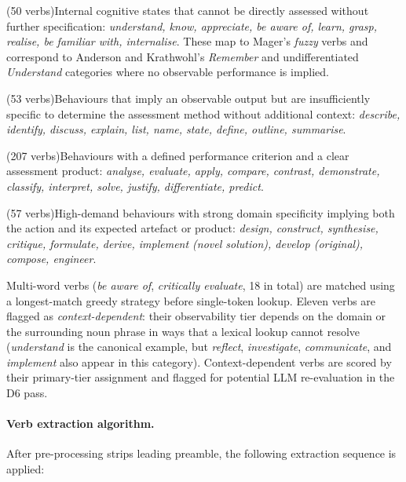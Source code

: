\documentclass[12pt, a4paper]{article}
\begin{document}
\begin{description}[leftmargin=3em, labelwidth=2.5em]
  \item[Tier 0 — Unobservable] (50 verbs)\quad Internal cognitive states that cannot be directly
    assessed without further specification: \textit{understand, know, appreciate,
    be aware of, learn, grasp, realise, be familiar with, internalise}.
    These map to Mager's \textit{fuzzy} verbs and correspond to Anderson and
    Krathwohl's \textit{Remember} and undifferentiated \textit{Understand} categories
    where no observable performance is implied.
  \item[Tier 1 — Weak observable] (53 verbs)\quad Behaviours that imply an observable
    output but are insufficiently specific to determine the assessment method without
    additional context: \textit{describe, identify, discuss, explain, list, name,
    state, define, outline, summarise}.
  \item[Tier 2 — Clear observable] (207 verbs)\quad Behaviours with a defined
    performance criterion and a clear assessment product: \textit{analyse, evaluate,
    apply, compare, contrast, demonstrate, classify, interpret, solve, justify,
    differentiate, predict}.
  \item[Tier 3 — Precise/contextual] (57 verbs)\quad High-demand behaviours with strong
    domain specificity implying both the action and its expected artefact or product:
    \textit{design, construct, synthesise, critique, formulate, derive, implement
    (novel solution), develop (original), compose, engineer}.
\end{description}

Multi-word verbs (\textit{be aware of}, \textit{critically evaluate}, 18 in total)
are matched using a longest-match greedy strategy before single-token lookup.
Eleven verbs are flagged as \textit{context-dependent}: their observability tier
depends on the domain or the surrounding noun phrase in ways that a lexical lookup
cannot resolve (\textit{understand} is the canonical example, but \textit{reflect},
\textit{investigate}, \textit{communicate}, and \textit{implement} also appear in
this category). Context-dependent verbs are scored by their primary-tier assignment
and flagged for potential LLM re-evaluation in the D6 pass.

\paragraph{Verb extraction algorithm.}
After pre-processing strips leading preamble, the following extraction sequence is applied:
\end{document}
